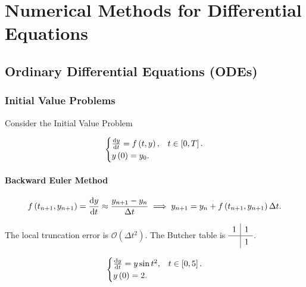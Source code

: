\chapter{Numerical Methods for Differential Equations}

\section{Ordinary Differential Equations (ODEs)}

\subsection{Initial Value Problems}


Consider the Initial Value Problem

\begin{equation*}
	\begin{cases}
		\diff{y}{t}=
		f\left(t,y\right), & t\in\left[0,T\right]. \\
		y\left(0\right)=
		y_{0}.             &
	\end{cases}
\end{equation*}

\subsubsection{Backward Euler Method}
\begin{equation*}
	f\left(t_{n+1},y_{n+1}\right)
	=\diff{y}{t}\approx
	\frac{y_{n+1}-y_{n}}{\Delta t}\implies
	y_{n+1}=
	y_{n}+
	f\left(t_{n+1},y_{n+1}\right)
	\Delta t.
\end{equation*}

The local truncation error is
\begin{math}
	\mathcal{O}
	\left(\Delta t^{2}\right)
\end{math}.
The Butcher table is
\begin{math}
	\renewcommand\arraystretch{1.2}
	\begin{array}
		{c|c}
		1 & 1 \\
		\hline
		  & 1
	\end{array}
\end{math}.

\begin{equation*}
	\begin{cases}
		\diff{y}{t}=
		y\sin t^{2},       & t\in\left[0,5\right]. \\
		y\left(0\right)=2. &
	\end{cases}
\end{equation*}


